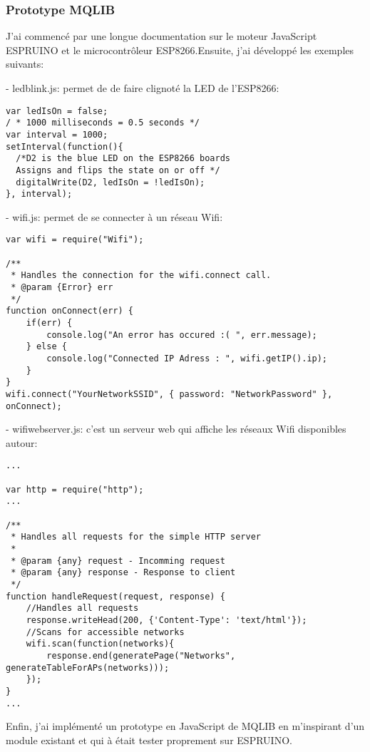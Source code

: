 \subsubsection{Prototype MQLIB}
J'ai commencé par une longue documentation sur le moteur JavaScript ESPRUINO et le microcontrôleur ESP8266.Ensuite, j'ai développé les exemples suivants:

- ledblink.js: permet de de faire clignoté la LED de l'ESP8266:

\begin{lstlisting}
var ledIsOn = false;
/ * 1000 milliseconds = 0.5 seconds */
var interval = 1000; 
setInterval(function(){
  /*D2 is the blue LED on the ESP8266 boards
  Assigns and flips the state on or off */
  digitalWrite(D2, ledIsOn = !ledIsOn);
}, interval);
\end{lstlisting}

- wifi.js: permet de se connecter à un réseau Wifi:


\begin{lstlisting}
var wifi = require("Wifi");

/**
 * Handles the connection for the wifi.connect call.
 * @param {Error} err
 */
function onConnect(err) {
    if(err) {
        console.log("An error has occured :( ", err.message);
    } else {
        console.log("Connected IP Adress : ", wifi.getIP().ip);
    }
}
wifi.connect("YourNetworkSSID", { password: "NetworkPassword" }, onConnect);
\end{lstlisting}

- wifiwebserver.js: c'est un serveur web qui affiche les réseaux Wifi disponibles autour:

\begin{lstlisting}
...

var http = require("http");
...

/**
 * Handles all requests for the simple HTTP server
 * 
 * @param {any} request - Incomming request
 * @param {any} response - Response to client
 */
function handleRequest(request, response) {
    //Handles all requests
    response.writeHead(200, {'Content-Type': 'text/html'});
    //Scans for accessible networks
    wifi.scan(function(networks){    
        response.end(generatePage("Networks", generateTableForAPs(networks)));
    });
}
...
\end{lstlisting}

Enfin, j'ai implémenté un prototype en JavaScript de MQLIB en m'inspirant d'un module existant et qui à était tester proprement sur ESPRUINO.

